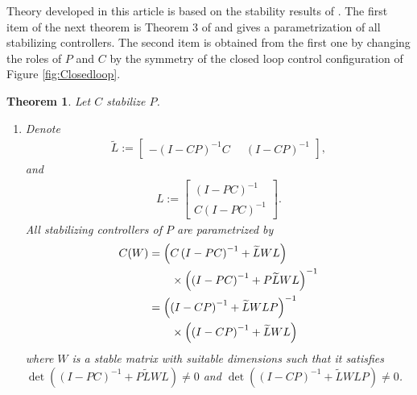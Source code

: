 \documentclass[11pt, a4paper]{amsart}
\newcommand{\inv}{^{-1}}
\newtheorem{theorem}{Theorem}[section]
\newcommand{\Plant}{P}										%
\newcommand{\Cont}{C}										%
\begin{document}
Theory developed in this article is based on the stability results of \cite{Quadrat2006}. The first item of the next theorem is Theorem 3 of \cite{Quadrat2006} and gives a parametrization of all stabilizing controllers. The second item is obtained from the first one by changing the roles of $\Plant$ and $\Cont$ by the symmetry of the closed loop control configuration of Figure \ref{fig:Closedloop}.
\begin{theorem}
\label{thm:Stability}
Let $\Cont$ stabilize $\Plant$.
\begin{enumerate}[1.]
\item Denote
\begin{align*}
\widetilde{L} :=\begin{bmatrix}
-\left(I-\Cont\Plant\right)\inv \Cont\;\; & \left(I-\Cont\Plant\right)\inv
\end{bmatrix},
\end{align*}
and
\begin{align*}
L :=\begin{bmatrix}
\left(I-\Plant\Cont\right)\inv \\
\Cont\left(I-\Plant\Cont\right)\inv 
\end{bmatrix}.
\end{align*}
All stabilizing controllers of $\Plant$ are parametrized by
\begin{subequations}
\begin{align}\label{eqn:AllStabilizingControllers}
\Cont(W) & =\left(\Cont\left(I-\Plant\Cont\right)\inv +\widetilde{L}WL\right)\notag\\
& \qquad \times\left(\left(I-\Plant\Cont\right)\inv +\Plant \widetilde{L}WL\right)\inv \\
& =\left(\left(I-\Cont\Plant\right)\inv +\widetilde{L}WL\Plant\right)\inv \notag\\
&\qquad \times\left(\left(I-\Cont\Plant\right)\inv +\widetilde{L}WL\right)
\end{align}
\end{subequations}
where $W$ is a stable matrix with suitable dimensions such that it satisfies $\det\left(\left(I-\Plant\Cont\right)\inv +\Plant \widetilde{L}WL\right)\neq 0$ and $\det\left(\left(I-\Cont\Plant\right)\inv +\widetilde{L}WL\Plant\right)\neq 0$.


\end{enumerate}
\end{theorem}
\end{document}
